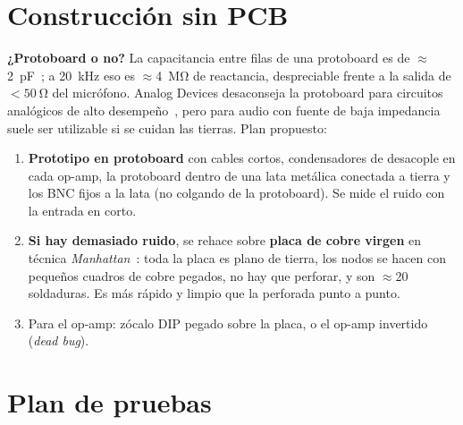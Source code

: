 \documentclass[11pt,a4paper]{article}
\begin{document}
\section{Construcción sin PCB}

\textbf{¿Protoboard o no?} La capacitancia entre filas de una protoboard es de $\approx$\SI{2}{\pico\farad}~\cite{breadboard}; a
\SI{20}{\kilo\hertz} eso es $\approx$\SI{4}{\mega\ohm} de reactancia, despreciable frente a la salida de $<\SI{50}{\ohm}$ del micrófono.
Analog Devices desaconseja la protoboard para circuitos analógicos de alto desempeño~\cite{mt100}, pero para audio con fuente
de baja impedancia suele ser utilizable si se cuidan las tierras. Plan propuesto:
\begin{enumerate}
  \item \textbf{Prototipo en protoboard} con cables cortos, condensadores de desacople en cada op-amp, la protoboard
        dentro de una lata metálica conectada a tierra y los BNC fijos a la lata (no colgando de la protoboard). Se mide el ruido
        con la entrada en corto.
  \item \textbf{Si hay demasiado ruido}, se rehace sobre \textbf{placa de cobre virgen} en técnica \emph{Manhattan}~\cite{manhattan}:
        toda la placa es plano de tierra, los nodos se hacen con pequeños cuadros de cobre pegados, no hay que perforar, y son
        $\approx$20 soldaduras. Es más rápido y limpio que la perforada punto a punto.
  \item Para el op-amp: zócalo DIP pegado sobre la placa, o el op-amp invertido (\emph{dead bug}).
\end{enumerate}

\section{Plan de pruebas}
\end{document}
